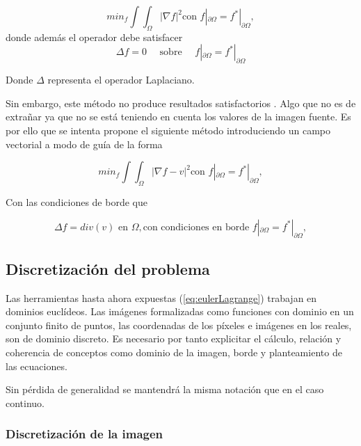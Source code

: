 \documentclass[11pt,twoside,titlepage,a4paper]{article}
\numberwithin{equation}{section} %
\theoremstyle{usual}
\begin{document}
\begin{equation}
min_ f \int \int_\Omega | \nabla f| ^2 \text{con } f|_{\partial \Omega} = f^* | _{\partial \Omega}, 
\end{equation}
donde  además el operador debe satisfacer 
\begin{equation}
 \Delta f = 0 \quad \text{ sobre } \quad f|_{\partial \Omega} = f^* | _{\partial \Omega}
\end{equation}

Donde $\Delta$ representa el operador Laplaciano.  

Sin embargo, este método no produce resultados satisfactorios \cite{poissonImageEditing}. Algo que no es de extrañar ya que no se está teniendo en cuenta los valores de la imagen fuente. Es por ello que se intenta propone el siguiente método \cite{10.1145/344779.344972} introduciendo  un campo vectorial a modo de guía de la forma 

\begin{equation}
\label{eq:eulerLagrange}
min_ f \int \int_\Omega | \nabla f - v | ^2 \text{con } f|_{\partial \Omega} = f^* | _{\partial \Omega}, 
\end{equation}  

Con las condiciones de borde que   


\begin{equation}
\label{eq:condicionesBordeContinuo}
\Delta f = div(v) \text{ en } \Omega, \text{con condiciones en borde } f|_{\partial \Omega} = f^* | _{\partial \Omega}, 
\end{equation}    


\subsection{Discretización del problema}

Las herramientas hasta ahora expuestas (\ref{eq:eulerLagrange}) trabajan en dominios euclídeos. Las imágenes formalizadas como funciones con dominio en un conjunto finito de puntos, las coordenadas de los píxeles e imágenes en los reales, son de dominio discreto. Es necesario por tanto explicitar el cálculo, relación y coherencia de conceptos como dominio de la imagen, borde y planteamiento de las ecuaciones.

Sin pérdida de generalidad se mantendrá la misma notación que en el caso continuo. 

\subsubsection{Discretización de la imagen} 
\end{document}
